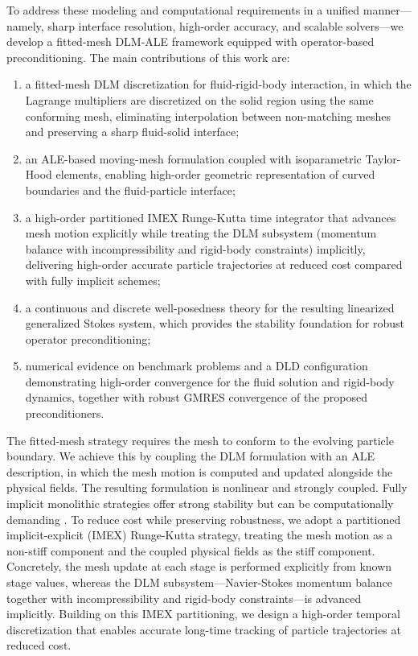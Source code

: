 \documentclass{article}
\begin{document}
To address these modeling and computational requirements in a unified manner---namely, sharp interface resolution, high-order accuracy, and scalable solvers---we develop a fitted-mesh DLM-ALE framework equipped with operator-based preconditioning. The main contributions of this work are:
\begin{enumerate}
\item  a fitted-mesh DLM discretization for fluid-rigid-body interaction, in which the Lagrange multipliers are discretized on the solid region using the same conforming mesh, eliminating interpolation between non-matching meshes and preserving a sharp fluid-solid interface;
\item  an ALE-based moving-mesh formulation coupled with isoparametric Taylor-Hood elements, enabling high-order geometric representation of curved boundaries and the fluid-particle interface;
\item  a high-order partitioned IMEX Runge-Kutta time integrator that advances mesh motion explicitly while treating the DLM subsystem (momentum balance with incompressibility and rigid-body constraints) implicitly, delivering high-order accurate particle trajectories at reduced cost compared with fully implicit schemes;
\item  a continuous and discrete well-posedness theory for the resulting linearized generalized Stokes system, which provides the stability foundation for robust operator preconditioning;
\item  numerical evidence on benchmark problems and a DLD configuration demonstrating high-order convergence for the fluid solution and rigid-body dynamics, together with robust GMRES convergence of the proposed preconditioners.
\end{enumerate}


The fitted-mesh strategy requires the mesh to conform to the evolving particle boundary. We achieve this by coupling the DLM formulation with an ALE description, in which the mesh motion is computed and updated alongside the physical fields. The resulting formulation is nonlinear and strongly coupled. Fully implicit monolithic strategies offer strong stability but can be computationally demanding \cite{barker2010two,wu2014fully,kong2019simulation,li2021energy}. To reduce cost while preserving robustness, we adopt a partitioned implicit-explicit (IMEX) Runge-Kutta strategy, treating the mesh motion as a non-stiff component and the coupled physical fields as the stiff component. Concretely, the mesh update at each stage is performed explicitly from known stage values, whereas the DLM subsystem—Navier-Stokes momentum balance together with incompressibility and rigid-body constraints—is advanced implicitly. Building on this IMEX partitioning, we design a high-order temporal discretization that enables accurate long-time tracking of particle trajectories at reduced cost.
\end{document}
